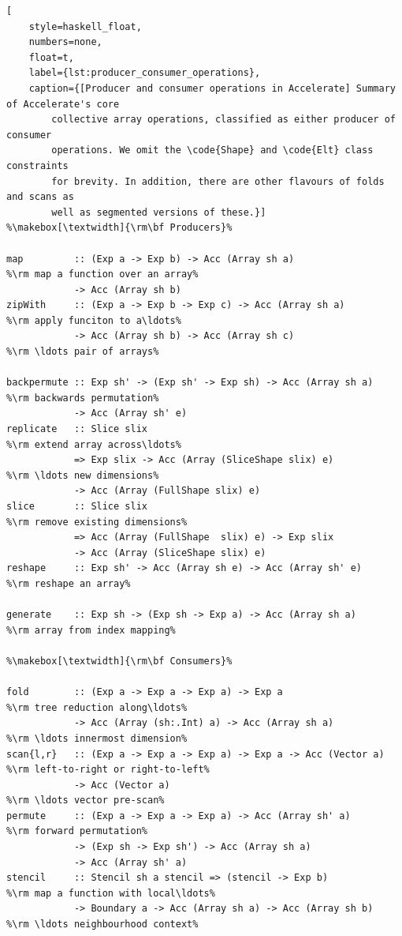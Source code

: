 \begin{lstlisting}[
    style=haskell_float,
    numbers=none,
    float=t,
    label={lst:producer_consumer_operations},
    caption={[Producer and consumer operations in Accelerate] Summary of Accelerate's core
        collective array operations, classified as either producer of consumer
        operations. We omit the \code{Shape} and \code{Elt} class constraints
        for brevity. In addition, there are other flavours of folds and scans as
        well as segmented versions of these.}]
%\makebox[\textwidth]{\rm\bf Producers}%

map         :: (Exp a -> Exp b) -> Acc (Array sh a)                   %\rm map a function over an array%
            -> Acc (Array sh b)
zipWith     :: (Exp a -> Exp b -> Exp c) -> Acc (Array sh a)          %\rm apply funciton to a\ldots%
            -> Acc (Array sh b) -> Acc (Array sh c)                   %\rm \ldots pair of arrays%

backpermute :: Exp sh' -> (Exp sh' -> Exp sh) -> Acc (Array sh a)     %\rm backwards permutation%
            -> Acc (Array sh' e)
replicate   :: Slice slix                                             %\rm extend array across\ldots%
            => Exp slix -> Acc (Array (SliceShape slix) e)            %\rm \ldots new dimensions%
            -> Acc (Array (FullShape slix) e)
slice       :: Slice slix                                             %\rm remove existing dimensions%
            => Acc (Array (FullShape  slix) e) -> Exp slix
            -> Acc (Array (SliceShape slix) e)
reshape     :: Exp sh' -> Acc (Array sh e) -> Acc (Array sh' e)       %\rm reshape an array%

generate    :: Exp sh -> (Exp sh -> Exp a) -> Acc (Array sh a)        %\rm array from index mapping%

%\makebox[\textwidth]{\rm\bf Consumers}%

fold        :: (Exp a -> Exp a -> Exp a) -> Exp a                     %\rm tree reduction along\ldots%
            -> Acc (Array (sh:.Int) a) -> Acc (Array sh a)            %\rm \ldots innermost dimension%
scan{l,r}   :: (Exp a -> Exp a -> Exp a) -> Exp a -> Acc (Vector a)   %\rm left-to-right or right-to-left%
            -> Acc (Vector a)                                         %\rm \ldots vector pre-scan%
permute     :: (Exp a -> Exp a -> Exp a) -> Acc (Array sh' a)         %\rm forward permutation%
            -> (Exp sh -> Exp sh') -> Acc (Array sh a)
            -> Acc (Array sh' a)
stencil     :: Stencil sh a stencil => (stencil -> Exp b)             %\rm map a function with local\ldots%
            -> Boundary a -> Acc (Array sh a) -> Acc (Array sh b)     %\rm \ldots neighbourhood context%
\end{lstlisting}


